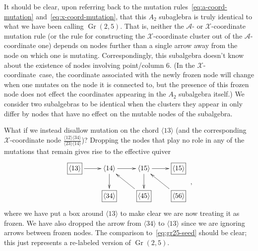 \documentclass[12pt]{article}
\DeclareMathOperator{\Gr}{Gr}
\def\ket#1{\langle #1 \rangle}
\def\x{\mathcal{X}}
\def\xcoord{$\mathcal{X}$-coordinate}
\def\a{\mathcal{A}}
\begin{document}
It should be clear, upon referring back to the mutation rules~\eqref{eq:a-coord-mutation} and~\eqref{eq:x-coord-mutation}, that this $A_2$ subaglebra is truly identical to what we have been calling $\Gr(2,5)$. That is, neither the $\a$- or $\x$-coordinate mutation rule (or the rule for constructing the $\x$-coordinate cluster out of the $\a$-coordinate one) depends on nodes further than a single arrow away from the node on which one is mutating. Correspondingly, this subalgebra doesn't know about the existence of nodes involving point/column 6. (In the \xcoord\ case, the coordinate associated with the newly frozen node will change when one mutates on the node it is connected to, but the presence of this frozen node does not effect the coordinates appearing in the $A_2$ subalgebra itself.) We consider two subalgebras to be identical when the clusters they appear in only differ by nodes that have no effect on the mutable nodes of the subalgebra.  

What if we instead disallow mutation on the chord $\ket{13}$ (and the corresponding $\x$-coordinate node $\frac{\ket{12}\ket{34}}{\ket{23}\ket{14}}$)? Dropping the nodes that play no role in any of the mutations that remain gives rise to the effective quiver
\begin{equation}\label{eq:gr26-subalgebra-seed}
\begin{gathered}
\begin{xy} 0;<1pt,0pt>:<0pt,-1pt>::
	(25,0) *+{\langle 14\rangle} ="0",
	(75,0) *+{\langle 15\rangle} ="1",
	(125,0) *+{\framebox[5ex]{$\langle 15\rangle$}} ="2",
	(125,40) *+{\framebox[5ex]{$\langle 56\rangle$}} ="3",
	(75,40) *+{\framebox[5ex]{$\langle 45\rangle$}} ="4",
	(25,40) *+{\framebox[5ex]{$\langle 34\rangle$}} ="5",
	(-25,0) *+{\framebox[5ex]{$\langle 13\rangle$}} ="6",
	"0", {\ar"1"},
	"4", {\ar"0"},
	"0", {\ar"5"},
	"6", {\ar"0"},
	"1", {\ar"2"},
	"3", {\ar"1"},
	"1", {\ar"4"},
\end{xy}
\end{gathered} \ ,
\end{equation}
where we have put a box around $\ket{13}$ to make clear we are now treating it as frozen. We have also dropped the arrow from $\ket{34}$ to $\ket{13}$ since we are ignoring arrows between frozen nodes. The comparison to~\eqref{eq:gr25-seed} should be clear; this just represents a re-labeled version of $\Gr(2,5)$. 
\end{document}
